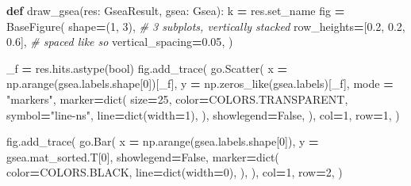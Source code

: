 \documentclass[
]{book}
\newenvironment{Shaded}{\begin{snugshade}}{\end{snugshade}}
\newcommand{\BuiltInTok}[1]{#1}
\newcommand{\CommentTok}[1]{\textcolor[rgb]{0.56,0.35,0.01}{\textit{#1}}}
\newcommand{\DecValTok}[1]{\textcolor[rgb]{0.00,0.00,0.81}{#1}}
\newcommand{\FloatTok}[1]{\textcolor[rgb]{0.00,0.00,0.81}{#1}}
\newcommand{\KeywordTok}[1]{\textcolor[rgb]{0.13,0.29,0.53}{\textbf{#1}}}
\newcommand{\NormalTok}[1]{#1}
\newcommand{\OperatorTok}[1]{\textcolor[rgb]{0.81,0.36,0.00}{\textbf{#1}}}
\newcommand{\StringTok}[1]{\textcolor[rgb]{0.31,0.60,0.02}{#1}}
\newcommand{\VariableTok}[1]{\textcolor[rgb]{0.00,0.00,0.00}{#1}}
\begin{document}
\begin{Shaded}
\begin{Highlighting}[numbers=left,,]
\KeywordTok{def}\NormalTok{ draw\_gsea(res: GseaResult, gsea: Gsea):}
\NormalTok{    k }\OperatorTok{=}\NormalTok{ res.set\_name}
\NormalTok{    fig }\OperatorTok{=}\NormalTok{ BaseFigure(}
\NormalTok{        shape}\OperatorTok{=}\NormalTok{(}\DecValTok{1}\NormalTok{, }\DecValTok{3}\NormalTok{),                   }\CommentTok{\# 3 subplots, vertically stacked}
\NormalTok{        row\_heights}\OperatorTok{=}\NormalTok{[}\FloatTok{0.2}\NormalTok{, }\FloatTok{0.2}\NormalTok{, }\FloatTok{0.6}\NormalTok{],    }\CommentTok{\# spaced like so}
\NormalTok{        vertical\_spacing}\OperatorTok{=}\FloatTok{0.05}\NormalTok{,}
\NormalTok{    )}

\NormalTok{    \_f }\OperatorTok{=}\NormalTok{ res.hits.astype(}\BuiltInTok{bool}\NormalTok{)}
\NormalTok{    fig.add\_trace(}
\NormalTok{        go.Scatter(}
\NormalTok{            x }\OperatorTok{=}\NormalTok{ np.arange(gsea.labels.shape[}\DecValTok{0}\NormalTok{])[\_f],}
\NormalTok{            y }\OperatorTok{=}\NormalTok{ np.zeros\_like(gsea.labels)[\_f],}
\NormalTok{            mode }\OperatorTok{=} \StringTok{"markers"}\NormalTok{,}
\NormalTok{            marker}\OperatorTok{=}\BuiltInTok{dict}\NormalTok{(}
\NormalTok{                size}\OperatorTok{=}\DecValTok{25}\NormalTok{,}
\NormalTok{                color}\OperatorTok{=}\NormalTok{COLORS.TRANSPARENT,}
\NormalTok{                symbol}\OperatorTok{=}\StringTok{"line{-}ns"}\NormalTok{,}
\NormalTok{                line}\OperatorTok{=}\BuiltInTok{dict}\NormalTok{(width}\OperatorTok{=}\DecValTok{1}\NormalTok{),}
\NormalTok{            ),}
\NormalTok{            showlegend}\OperatorTok{=}\VariableTok{False}\NormalTok{,}
\NormalTok{        ),}
\NormalTok{        col}\OperatorTok{=}\DecValTok{1}\NormalTok{, row}\OperatorTok{=}\DecValTok{1}\NormalTok{,}
\NormalTok{    )}

\NormalTok{    fig.add\_trace(}
\NormalTok{        go.Bar(}
\NormalTok{            x }\OperatorTok{=}\NormalTok{ np.arange(gsea.labels.shape[}\DecValTok{0}\NormalTok{]),}
\NormalTok{            y }\OperatorTok{=}\NormalTok{ gsea.mat\_sorted.T[}\DecValTok{0}\NormalTok{],}
\NormalTok{            showlegend}\OperatorTok{=}\VariableTok{False}\NormalTok{,}
\NormalTok{            marker}\OperatorTok{=}\BuiltInTok{dict}\NormalTok{(}
\NormalTok{                color}\OperatorTok{=}\NormalTok{COLORS.BLACK,}
\NormalTok{                line}\OperatorTok{=}\BuiltInTok{dict}\NormalTok{(width}\OperatorTok{=}\DecValTok{0}\NormalTok{),}
\NormalTok{            ),}
\NormalTok{        ),}
\NormalTok{        col}\OperatorTok{=}\DecValTok{1}\NormalTok{, row}\OperatorTok{=}\DecValTok{2}\NormalTok{,}
\NormalTok{    )}


\end{Highlighting}
\end{Shaded}
\end{document}
